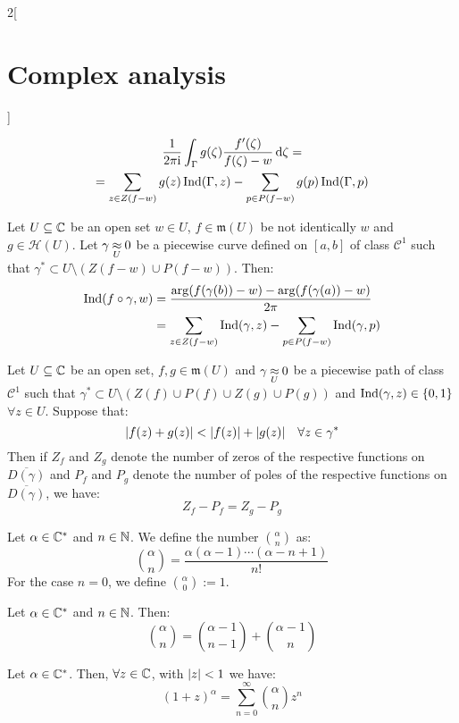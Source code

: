 \documentclass[../../../main.tex]{subfiles}
\begin{document}
\begin{multicols}{2}[\section{Complex analysis}]
\begin{theorem}
    \begin{multline*}
      \frac{1}{2\pi\mathrm{i}}\int_{\Gamma}g(\zeta)\frac{f'(\zeta)}{f(\zeta)-w}\dd{\zeta}=\\=\sum_{z\in Z(f-w)}g(z)\operatorname{Ind}(\Gamma,z)-\sum_{p\in P(f-w)}g(p)\operatorname{Ind}(\Gamma,p)
    \end{multline*}
  \end{theorem}
  \begin{corollary}
    Let $U\subseteq \mathbb{C}$ be an open set $w\in U$, $f\in\mathfrak{m}(U)$ be not identically $w$ and $g\in\mathcal{H}(U)$. Let $\gamma\mathbin{\underset{U}{\approx}} 0$ be a piecewise curve defined on $[a,b]$ of class $\mathcal{C}^1$ such that $\gamma^*\subset U\setminus (Z(f-w)\cup P(f-w))$. Then:
    \begin{align*}
      \operatorname{Ind}(f\circ\gamma,w) & =\frac{\arg(f(\gamma(b))-w)-\arg(f(\gamma(a))-w)}{2\pi}            \\
                           & =\sum_{z\in Z(f-w)}\operatorname{Ind}(\gamma,z)-\sum_{p\in P(f-w)}\operatorname{Ind}(\gamma,p)
    \end{align*}
  \end{corollary}
  \begin{theorem}
    Let $U\subseteq \mathbb{C}$ be an open set, $f,g\in\mathfrak{m}(U)$ and $\gamma\mathbin{\underset{U}{\approx}} 0$ be a piecewise path of class $\mathcal{C}^1$ such that $\gamma^*\subset U\setminus (Z(f)\cup P(f)\cup Z(g)\cup P(g))$ and $\operatorname{Ind}(\gamma,z)\in\{0,1\}$ $\forall z\in U$. Suppose that: $$\abs{f(z)+g(z)}<\abs{f(z)}+\abs{g(z)}\quad\forall z\in \gamma^*$$ Then if $Z_f$ and $Z_g$ denote the number of zeros of the respective functions on $\overline{D(\gamma)}$ and $P_f$ and $P_g$ denote the number of poles of the respective functions on $\overline{D(\gamma)}$, we have: $$Z_f-P_f=Z_g-P_g$$
  \end{theorem}
  \begin{definition}
    Let $\alpha\in\mathbb{C}^*$ and $n\in\mathbb{N}$. We define the number $\binom{\alpha}{n}$ as: $$\binom{\alpha}{n}=\frac{\alpha(\alpha-1)\cdots(\alpha-n+1)}{n!}$$ For the case $n=0$, we define $\binom{\alpha}{0}:=1$.
  \end{definition}
  \begin{proposition}
    Let $\alpha\in\mathbb{C}^*$ and $n\in\mathbb{N}$. Then:
    $$\binom{\alpha}{n}=\binom{\alpha-1}{n-1}+\binom{\alpha-1}{n}$$
  \end{proposition}
  \begin{theorem}
    Let $\alpha\in\mathbb{C}^*$. Then, $\forall z\in\mathbb{C}$, with $\abs{z}<1$ we have: $${(1+z)}^\alpha=\sum_{n=0}^\infty\binom{\alpha}{n}z^n$$

\end{theorem}
\end{multicols}
\end{document}
